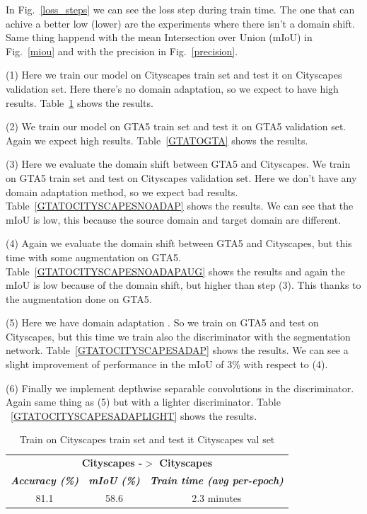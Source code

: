 \documentclass[conference]{IEEEtran}
\begin{document}
In Fig.~\ref{loss_steps} we can see the loss step during train time. The one that can achive a better low (lower) are the experiments
where there isn't a domain shift. Same thing happend with the mean Intersection over Union (mIoU) in Fig.~\ref{miou} and with the
precision in Fig.~\ref{precision}. 

(1) Here we train our model on Cityscapes train set and test it on Cityscapes validation set. Here there's no domain adaptation, so
we expect to have high results. Table~\ref{CityscapesToCityscapes} shows the results.

(2) We train our model on GTA5 train set and test it on GTA5 validation set. Again we expect high results.  
Table~\ref{GTATOGTA} shows the results.

(3) Here we evaluate the domain shift between GTA5 and Cityscapes. We train on GTA5 train set and test on Cityscapes validation set.
Here we don't have any domain adaptation method, so we expect bad results. Table~\ref{GTATOCITYSCAPESNOADAP} shows the results. We can 
see that the mIoU is low, this because the source domain and target domain are different. 

(4) Again we evaluate the domain shift between GTA5 and Cityscapes, but this time with some augmentation on GTA5. Table~\ref{GTATOCITYSCAPESNOADAPAUG}
shows the results and again the mIoU is low because of the domain shift, but higher than step (3). This thanks to the augmentation
done on GTA5.

(5) Here we have domain adaptation \cite{b3}. So we train on GTA5 and test on Cityscapes, but this time we train also the discriminator
with the segmentation network. Table~\ref{GTATOCITYSCAPESADAP} shows the results. We can see a slight improvement of performance
in the mIoU of 3\% with respect to (4).

(6) Finally we implement depthwise separable convolutions in the discriminator. Again same thing as (5) but with a lighter discriminator. Table
~\ref{GTATOCITYSCAPESADAPLIGHT} shows the results. 



\begin{table}[tb]
\caption{Train on Cityscapes train set and test it Cityscapes val set}
\begin{center}
\begin{tabular}{|c|c|c|}
\hline
\multicolumn{3}{|c|}{\textbf{Cityscapes -$>$ Cityscapes}} \\
\cline{1-3} 
\textbf{\textit{Accuracy (\%)}}& \textbf{\textit{mIoU (\%)}}& \textbf{\textit{Train time (avg per-epoch)}} \\
\hline
81.1& 58.6& 2.3 minutes   \\
\hline
\end{tabular}
\label{CityscapesToCityscapes}
\end{center}
\end{table}
\end{document}
